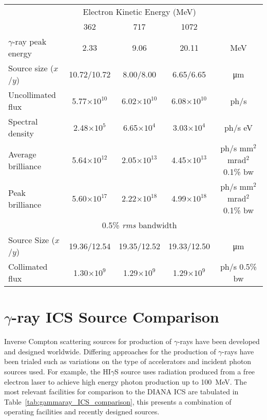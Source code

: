 \documentclass[../main.tex]{subfiles}
\begin{document}
\begin{table}[H]
\centering
\begin{tabular}{lcccc}
\hline\hline
 & \multicolumn{3}{c}{Electron Kinetic Energy (\si{\mega\electronvolt})} & \\
 \cline{2-4}
 & 362 & 717 & 1072 & \\
\hline
$\gamma$-ray peak energy  & 2.33 & 9.06 & 20.11 & \si{\mega\electronvolt}\\
Source size ($x$/$y$)  & 10.72/10.72 & 8.00/8.00 & 6.65/6.65 & \si{\micro\meter} \\
Uncollimated flux  & 5.77$\times 10^{10}$ & 6.02$\times 10^{10}$ & 6.08$\times 10^{10}$ & ph/\si{\second}\\
Spectral density  & 2.48$\times 10^{5}$ & 6.65$\times 10^{4}$ & 3.03$\times 10^{4}$ & ph/\si{\second} \si{\electronvolt}\\
Average brilliance  & 5.64$\times 10^{12}$ & 2.05$\times 10^{13}$ & 4.45$\times 10^{13}$ & ph/\si{\second} \si{\milli\meter}$^{2}$\si{\milli\radian}$^{2}$ 0.1\% bw\\
Peak brilliance  & 5.60$\times 10^{17}$ & 2.22$\times 10^{18}$ & 4.99$\times 10^{18}$ & ph/\si{\second} \si{\milli\meter}$^{2}$ \si{\milli\radian}$^{2}$ 0.1\% bw\\
\hline
 & \multicolumn{3}{c}{0.5\% \textit{rms} bandwidth} & \\
\hline
Source Size ($x$/$y$) & 19.36/12.54 & 19.35/12.52 & 19.33/12.50 & \si{\micro\meter} \\ 
Collimated flux  & 1.30$\times 10^{9}$ & 1.29$\times 10^{9}$ & 1.29$\times 10^{9}$ & ph/\si{\second} 0.5\% bw \\
\hline\hline
\end{tabular}
\label{tab:DIANA_spectral_output}
\end{table}



\section{$\gamma$-ray ICS Source Comparison}

Inverse Compton scattering sources for production of $\gamma$-rays have been developed and designed worldwide. Differing approaches for the production of $\gamma$-rays have been trialed such as variations on the type of accelerators and incident photon sources used. For example, the HI$\gamma$S source uses radiation produced from a free electron laser to achieve high energy photon production up to 100~\si{\mega\electronvolt}. The most relevant facilities for comparison to the DIANA ICS are tabulated in Table~\ref{tab:gammaray_ICS_comparison}, this presents a combination of operating facilities and recently designed sources. 
\end{document}
